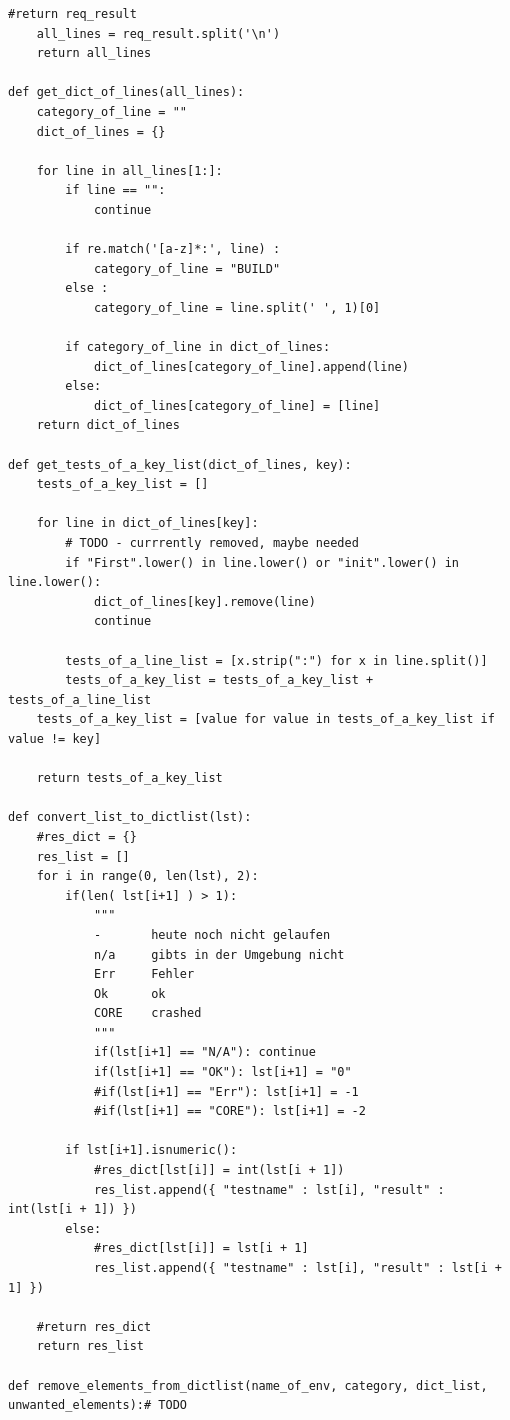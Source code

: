 \begin{lstlisting}[breaklines]
    #return req_result
    all_lines = req_result.split('\n')
    return all_lines

def get_dict_of_lines(all_lines):
    category_of_line = ""
    dict_of_lines = {}

    for line in all_lines[1:]:
        if line == "":
            continue

        if re.match('[a-z]*:', line) :
            category_of_line = "BUILD"
        else :
            category_of_line = line.split(' ', 1)[0]

        if category_of_line in dict_of_lines:
            dict_of_lines[category_of_line].append(line)
        else:
            dict_of_lines[category_of_line] = [line]
    return dict_of_lines

def get_tests_of_a_key_list(dict_of_lines, key):
    tests_of_a_key_list = []

    for line in dict_of_lines[key]:
        # TODO - currrently removed, maybe needed
        if "First".lower() in line.lower() or "init".lower() in line.lower():
            dict_of_lines[key].remove(line)
            continue

        tests_of_a_line_list = [x.strip(":") for x in line.split()]
        tests_of_a_key_list = tests_of_a_key_list + tests_of_a_line_list
    tests_of_a_key_list = [value for value in tests_of_a_key_list if value != key]
    
    return tests_of_a_key_list

def convert_list_to_dictlist(lst):
    #res_dict = {}
    res_list = []
    for i in range(0, len(lst), 2):
        if(len( lst[i+1] ) > 1):
            """
            -       heute noch nicht gelaufen
            n/a     gibts in der Umgebung nicht
            Err     Fehler
            Ok      ok
            CORE    crashed
            """
            if(lst[i+1] == "N/A"): continue
            if(lst[i+1] == "OK"): lst[i+1] = "0"
            #if(lst[i+1] == "Err"): lst[i+1] = -1
            #if(lst[i+1] == "CORE"): lst[i+1] = -2

        if lst[i+1].isnumeric():
            #res_dict[lst[i]] = int(lst[i + 1])
            res_list.append({ "testname" : lst[i], "result" : int(lst[i + 1]) })
        else:
            #res_dict[lst[i]] = lst[i + 1]
            res_list.append({ "testname" : lst[i], "result" : lst[i + 1] })

    #return res_dict
    return res_list

def remove_elements_from_dictlist(name_of_env, category, dict_list, unwanted_elements):# TODO


\end{lstlisting}
